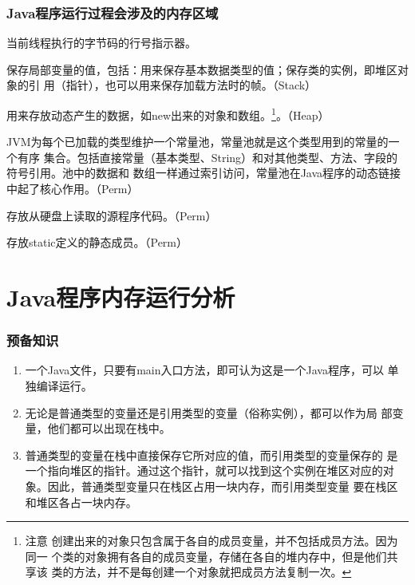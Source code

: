 \begin{frame}[fragile] %
\frametitle{Java程序运行过程会涉及的内存区域}
\begin{description}[<+-| structure@+>]\kai\small
\item[程序计数器] 当前线程执行的字节码的行号指示器。
\item[栈] 保存局部变量的值，包括：用来保存基本数据类型的值；保存类的实例，即堆区对象的引
  用（指针），也可以用来保存加载方法时的帧。（Stack）
\item[堆] 用来存放动态产生的数据，如new出来的对象和数组。\footnote{注意
    创建出来的对象只包含属于各自的成员变量，并不包括成员方法。因为同一
    个类的对象拥有各自的成员变量，存储在各自的堆内存中，但是他们共享该
    类的方法，并不是每创建一个对象就把成员方法复制一次。}。（Heap）
\item[常量池] JVM为每个已加载的类型维护一个常量池，常量池就是这个类型用到的常量的一个有序
  集合。包括直接常量（基本类型、String）和对其他类型、方法、字段的符号引用。池中的数据和
  数组一样通过索引访问，常量池在Java程序的动态链接中起了核心作用。（Perm）
\item[代码段] 存放从硬盘上读取的源程序代码。（Perm）
\item[数据段] 存放static定义的静态成员。{\Red （Perm）} 
\end{description}
\end{frame}


\section{Java程序内存运行分析}

\begin{frame}[fragile] %
\frametitle{预备知识}

\begin{enumerate}[<+-| structure@+>]
\item 一个Java文件，只要有main入口方法，即可认为这是一个Java程序，可以
  单独编译运行。
\item 无论是普通类型的变量还是引用类型的变量（俗称实例），都可以作为局
  部变量，他们都可以出现在栈中。
\item 普通类型的变量在栈中直接保存它所对应的值，而引用类型的变量保存的
  是一个指向堆区的指针。通过这个指针，就可以找到这个实例在堆区对应的对
  象。因此，{\hei\Red 普通类型变量只在栈区占用一块内存，而引用类型变量
    要在栈区和堆区各占一块内存}。
\end{enumerate}
\end{frame}

